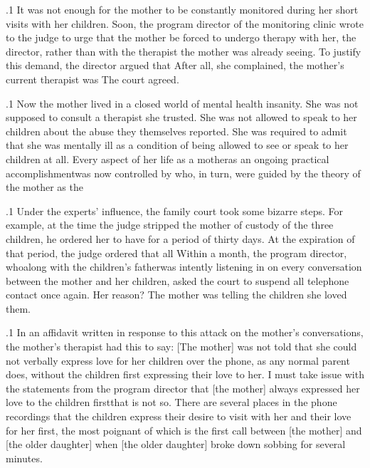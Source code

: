 \documentclass[11pt, twoside]{article}
\begin{document}
{\p.1{%
It was not enough for the mother to be constantly monitored during her short visits with her children. Soon, the program director of the
monitoring clinic wrote to the judge to urge that the mother be forced
to undergo therapy with her, the director, rather than with the therapist
the mother was already seeing. To justify this demand, the director argued that  After all, she complained, the mother’s current therapist was
 The
court agreed.
}%

\p.1{%
Now the mother lived in a closed world of mental health insanity. She
was not supposed to consult a therapist she trusted. She was not allowed
to speak to her children about the abuse they themselves reported. She
was required to admit that she was mentally ill as a condition of being
allowed to see or speak to her children at all. Every aspect of her life as a
mother\mdash{}as an ongoing practical accomplishment\mdash{}was now controlled
by  who, in turn, were guided by the theory of the mother as
the 
}%

\p.1{%
Under the experts’ influence, the family court took some bizarre steps.
For example, at the time the judge stripped the mother of custody of the three
children, he ordered her to have  for a period
of thirty days. At the expiration of that period, the judge ordered that
all  Within a month, the
program director, who\mdash{}along with the children’s father\mdash{}was intently
listening in on every conversation between the mother and her children,
asked the court to suspend all telephone contact once again. Her reason?
The mother was telling the children she loved them.
}%

\p.1{%
In an affidavit written in response to this  attack on the
mother’s conversations, the mother’s therapist had this to say:
[The mother] was not told that she could not verbally express love
for her children over the phone, as any normal parent does, without
the children first expressing their love to her. I must take issue with
the statements from the program director that [the mother] always
expressed her love to the children first\mdash{}that is not so. There are
several places in the phone recordings that the children express
their desire to visit with her and their love for her first, the most
poignant of which is the first call between [the mother] and [the
older daughter] when [the older daughter] broke down sobbing for
several minutes.
}%

}
\end{document}
